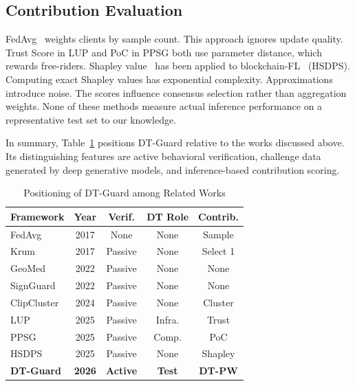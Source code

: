 \documentclass[conference]{IEEEtran}
\begin{document}
\subsection{Contribution Evaluation}

FedAvg~\cite{mcmahan2016communication} weights clients by sample count. This approach ignores update quality. Trust Score in LUP and PoC in PPSG both use parameter distance, which rewards free-riders. Shapley value~\cite{shapley1953value} has been applied to blockchain-FL~\cite{zhang2025bcsm} (HSDPS). Computing exact Shapley values has exponential complexity. Approximations introduce noise. The scores influence consensus selection rather than aggregation weights. None of these methods measure actual inference performance on a representative test set to our knowledge.


In summary, Table~\ref{tab:related_comparison} positions DT-Guard relative to the works discussed above. Its distinguishing features are active behavioral verification, challenge data generated by deep generative models, and inference-based contribution scoring.

\begin{table}[!t]
\caption{Positioning of DT-Guard among Related Works}
\label{tab:related_comparison}
\begin{center}
\footnotesize
\begin{tabular}{|l|c|c|c|c|}
\hline
\textbf{Framework} & \textbf{Year} & \textbf{Verif.} & \textbf{DT Role} & \textbf{Contrib.} \\
\hline
FedAvg~\cite{mcmahan2016communication} & 2017 & None & None & Sample \\
Krum~\cite{blanchard2017machine} & 2017 & Passive & None & Select 1 \\
GeoMed~\cite{pillutla2022robust} & 2022 & Passive & None & None \\
SignGuard~\cite{xu2022signguard} & 2022 & Passive & None & None \\
ClipCluster~\cite{zeng2024clipcluster} & 2024 & Passive & None & Cluster \\
\hline
LUP~\cite{issa2025dtbfl} & 2025 & Passive & Infra. & Trust \\
PPSG~\cite{zhang2025ppsg} & 2025 & Passive & Comp. & PoC \\
HSDPS~\cite{zhang2025bcsm} & 2025 & Passive & None & Shapley \\
\hline
\textbf{DT-Guard} & \textbf{2026} & \textbf{Active} & \textbf{Test} & \textbf{DT-PW} \\
\hline
\end{tabular}
\end{center}
\end{table}
\end{document}
